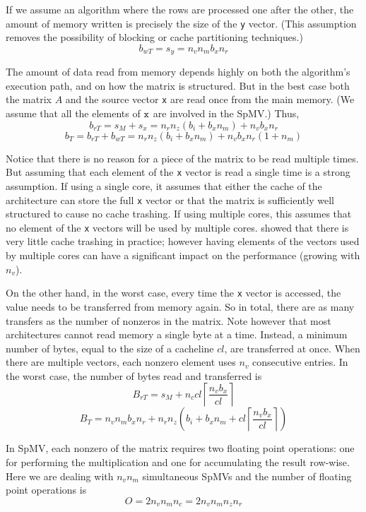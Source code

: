 \documentclass[10pt,conference,compsocconf]{IEEEtran}
\newcommand{\ceil}[1]{\left\lceil#1\right\rceil}
\begin{document}
If we assume an algorithm where the rows are processed one after
the other, the amount of memory written is precisely the
size of the {\tt y} vector. (This assumption removes the possibility of
blocking or cache partitioning techniques.) $$b_{wT} = s_y = n_v n_m b_x n_r$$

The amount of data read from memory depends highly on both the
algorithm's execution path, and on how the matrix is structured. But
in the best case both the matrix $A$ and the source vector {\tt x} are
read once from the main memory. (We assume that all the elements of
$\tt x$ are involved in the SpMV.)  Thus, $$b_{rT} = s_M + s_x = n_r
n_z (b_i + b_x n_m) + n_v b_x n_r$$
 $$b_T = b_{rT} + b_{wT} =  n_r n_z (b_i + b_x n_m) + n_v b_x n_r (1 + n_m)$$

Notice that there is no reason for a piece of the matrix to be read
multiple times. But assuming that each element of the {\tt x} vector
is read a single time is a strong assumption. If using a single core,
it assumes that either the cache of the architecture can store the full
{\tt x} vector or that the matrix is sufficiently well structured 
to cause no cache trashing. If using multiple cores, this assumes that
no element of the {\tt x} vectors will be used by multiple
cores. \cite{Saule13-ARXIV} showed that there is very little cache trashing
in practice; however having elements of the vectors used by
multiple cores can have a significant impact on the performance
(growing with $n_v$).

On the other hand, in the worst case, every time the {\tt x} vector is
accessed, the value needs to be transferred from memory again. So in
total, there are as many transfers as the number of nonzeros in the
matrix. Note however that most architectures cannot read memory a
single byte at a time. Instead, a minimum number of bytes, equal to
the size of a cacheline $cl$, are transferred at once.  When there are
multiple vectors, each nonzero element uses $n_v$ consecutive
entries. In the worst case, the number of bytes read and transferred is
$$B_{rT} = s_M + n_c cl \ceil{\frac{n_vb_x}{cl}} $$ 
$$B_T = n_v n_m b_x n_r + n_r n_z \left ( b_i + b_x n_m +  cl \ceil{\frac{n_vb_x}{cl}} \right)$$

In SpMV, each nonzero of the matrix requires two floating point
operations: one for performing the multiplication and one for
accumulating the result row-wise. Here we are dealing with $n_v n_m$
simultaneous SpMVs and the number of floating point operations is
$$O = 2 n_v n_m n_c = 2 n_v n_m n_z n_r$$
\end{document}
